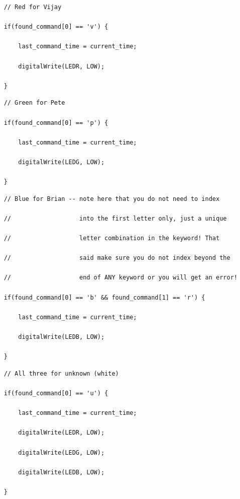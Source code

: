 \begin{enumerate}
  \begin{lstlisting}
    // Red for Vijay
    
    if(found_command[0] == 'v') {
        
        last_command_time = current_time;
        
        digitalWrite(LEDR, LOW);
        
    }
  \end{lstlisting} 
    
  \begin{lstlisting}
    // Green for Pete
    
    if(found_command[0] == 'p') {
        
        last_command_time = current_time;
        
        digitalWrite(LEDG, LOW);
        
    }
  \end{lstlisting} 
    
  \begin{lstlisting}
    // Blue for Brian -- note here that you do not need to index
    
    //                   into the first letter only, just a unique
    
    //                   letter combination in the keyword! That
    
    //                   said make sure you do not index beyond the
    
    //                   end of ANY keyword or you will get an error!
    
    if(found_command[0] == 'b' && found_command[1] == 'r') {
        
        last_command_time = current_time;
        
        digitalWrite(LEDB, LOW);
        
    }
  \end{lstlisting} 
    
  \begin{lstlisting}
    // All three for unknown (white)
    
    if(found_command[0] == 'u') {
        
        last_command_time = current_time;
        
        digitalWrite(LEDR, LOW);
        
        digitalWrite(LEDG, LOW);
        
        digitalWrite(LEDB, LOW);
        
    }
  \end{lstlisting} 

\end{enumerate}    
    
